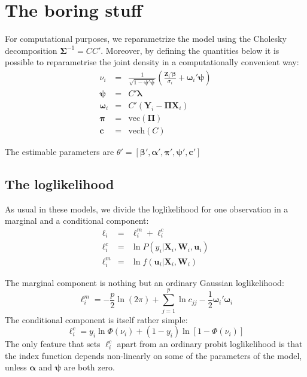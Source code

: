 \documentclass[a4paper,10pt]{article}
\newcommand{\Depvar}{y_{i}}
\newcommand{\Endog}{\mathbf{Y}_{i}}
\newcommand{\Expla}{\mathbf{Z}_{i}}
\newcommand{\ExoInst}{\mathbf{X}_{i}}
\newcommand{\CSReg}{\mathbf{W}_{i}}
\newcommand{\RfDist}{\mathbf{u}_i}
\newcommand{\ScRfDist}{\bm{\omega}_i}
\newcommand{\ProbitPar}{\bm{\beta}}
\newcommand{\RfPar}{\bm{\Pi}}
\newcommand{\vRfPar}{\bm{\pi}}
\newcommand{\VarPar}{\bm{\alpha}}
\newcommand{\CondSig}{\sigma_i}
\newcommand{\Covars}{\bm{\lambda}}
\newcommand{\ScCov}{\bm{\psi}}
\newcommand{\RfVar}{\bm{\Sigma}}
\newcommand{\vechC}{\mathbf{c}}
\begin{document}
\section{The boring stuff}


For computational purposes, we reparametrize the model using the
Cholesky decomposition $\RfVar^{-1} = CC'$. Moreover, by defining the
quantities below it is possible to reparametrise the joint density in
a computationally convenient way:
\begin{eqnarray*}
  \nu_i & = & \frac{1}{\sqrt{1- \ScCov' \ScCov}}
  \left( \frac{\Expla'\ProbitPar}{\CondSig}  + \ScRfDist' \ScCov \right) \\
  \ScCov & = & C'\Covars \\
  \ScRfDist & = & C' \left(\Endog - \RfPar \ExoInst\right) \\
  \vRfPar & = & \mathrm{vec}\left(\RfPar\right) \\
  \vechC & = & \mathrm{vech}(C)
\end{eqnarray*}

The estimable parameters are $\theta' = \left[\ProbitPar', \VarPar',
  \vRfPar', \ScCov', \vechC' \right]$

\subsection{The loglikelihood}
\label{sec:loglik}

As usual in these models, we divide the loglikelihood for one
observation in a marginal and a conditional component:
\begin{eqnarray*}
  \ell_i & = & \ell^m_i + \ell^c_i \\
  \ell^c_i & = & \ln P(\Depvar | \ExoInst, \CSReg, \RfDist) \\
  \ell^m_i & = & \ln f(\RfDist | \ExoInst, \CSReg) 
\end{eqnarray*}

The marginal component is nothing but an ordinary Gaussian
loglikelihood:
\[
\ell^m_i = -\frac{p}{2}\ln(2\pi) + \sum_{j=1}^p \ln c_{jj} - 
\frac{1}{2}\ScRfDist' \ScRfDist
\]
The conditional component is itself rather simple:
\begin{equation}
  \ell^c_i = \Depvar \ln\Phi(\nu_i) + \left(1-\Depvar\right)
  \ln \left[1-\Phi\left(\nu_i \right)\right]
\end{equation}
The only feature that sets $\ell^c_i$ apart from an ordinary probit
loglikelihood is that the index function depends non-linearly on some
of the parameters of the model, unless $\VarPar$ and $\ScCov$ are both
zero.
\end{document}
